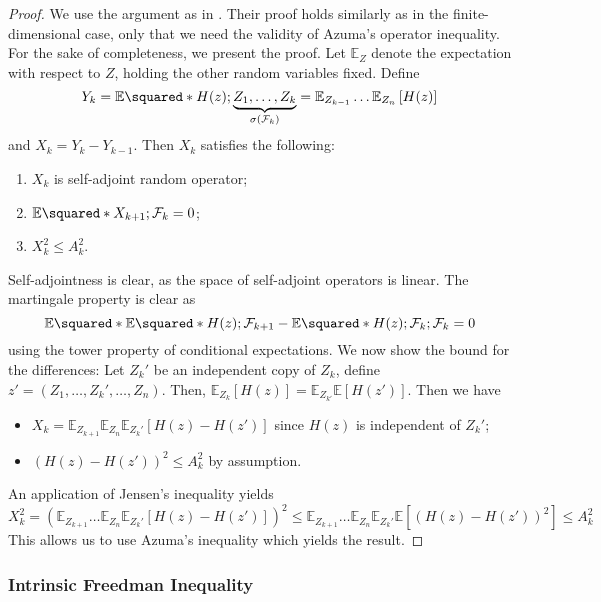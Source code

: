 \begin{proof}
  We use the argument as in \cite{tropp2011user}. Their proof holds similarly as in the finite-dimensional case, only that we need the validity of Azuma's operator inequality. For the sake of completeness, we present the proof.
    Let \( \mathbb{E}_{Z} \) denote the expectation with respect to \( Z \), holding the other random variables fixed. Define 
    \[ Y_k=\mathbb{E}\squared*{H(z);\underbrace{Z_1,\dots,Z_k}_{\sigma(\mathcal{F}_k)}} = \mathbb{E}_{Z_{k-1}}\dots \mathbb{E}_{Z_n} \left[H(z)\right]\]
and \( X_k = Y_k-Y_{k-1} \). Then \( X_k \) satisfies the following:
\begin{enumerate}[1)]
  \item \( X_k \) is self-adjoint random operator;
  \item \( \mathbb{E}\squared*{X_{k+1};\mathcal{F}_k}=0 \);
  \item \( X_k^{2}\leq A_k^2 \).
\end{enumerate}
Self-adjointness is clear, as the space of self-adjoint operators is linear. The martingale property is clear as
\[ \mathbb{E}\squared*{\mathbb{E}\squared*{H(z);\mathcal{F}_{k+1}}- \mathbb{E}\squared*{H(z);\mathcal{F}_k};\mathcal{F}_k}=0 \]
using the tower property of conditional expectations. We now show the bound for the differences: Let \( Z_k'  \) be an independent copy of \( Z_k \), define \( z'=(Z_1,\dots,Z_k',\dots,Z_n)\). Then, \( \mathbb{E}_{Z_{k}}\left[H(z)\right] = \mathbb{E}_{Z_{k'}}\mathbb{E}\left[H(z')\right] \). Then we have
\begin{itemize}
  \item \( X_k=\mathbb{E}_{Z_{k+1}} \mathbb{E}_{Z_{n}} \mathbb{E}_{Z_{k}'}\left[H(z)-H(z')\right] \) since \( H(z) \) is independent of \( Z_k' \);
  \item \( (H(z)-H(z'))^{2} \leq A_k^{2} \) by assumption.
\end{itemize}
An application of Jensen's inequality yields
\[ X_k^{2}=\left(\mathbb{E}_{Z_{k+1}}\dots \mathbb{E}_{Z_n} \mathbb{E}_{Z_{k}'}\left[H(z)-H(z')\right]\right)^{2} \leq \mathbb{E}_{Z_{k+1}} \dots \mathbb{E}_{Z_n} \mathbb{E}_{Z_k'}\mathbb{E}\left[\left(H(z)-H(z')\right)^{2}\right] \leq A_k^{2} \]
This allows us to use Azuma's inequality which yields the result.
  \end{proof}


\subsubsection{Intrinsic Freedman Inequality}

